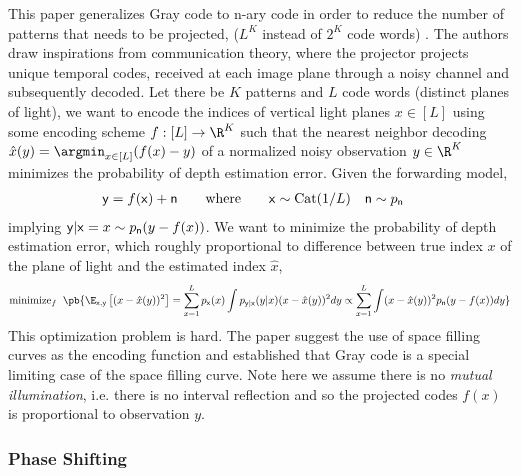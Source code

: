 \documentclass[../writeup.tex]{subfiles}
\begin{document}
This paper generalizes Gray code to n-ary code in order to reduce the number of patterns that needs to be projected, ($L^K$ instead of $2^K$ code words) \cite{hornOptimalStructuredLight1997}. The authors draw inspirations from communication theory, where the projector projects unique temporal codes, received at each image plane through a noisy channel and subsequently decoded. Let there be $K$ patterns and $L$ code words (distinct planes of light), we want to encode the indices of vertical light planes $x\in [L]$ using some encoding scheme $f:[L] \to \R^K$ such that the nearest neighbor decoding $\hat{x}(y) = \argmin_{x\in [L]} ( f(x)-y )$ of a normalized noisy observation $y\in\R^K$ minimizes the probability of depth estimation error. Given the forwarding model,
\begin{align*}
    \mathsf{y} = f(\mathsf{x}) + \mathsf{n}
    \quad\quad\text{where}\quad\quad
    \mathsf{x} 
        &\sim \text{Cat}(1/L)
    \quad
    \mathsf{n}
        \sim p_{\mathsf{n}}
\end{align*}
implying $\mathsf{y}|\mathsf{x}=x\sim p_{\mathsf{n}}(y - f(x))$. We want to minimize the probability of depth estimation error, which roughly proportional to difference between true index $x$ of the plane of light and the estimated index $\hat{x}$,
\begin{align*}
    \text{minimize}_{f}\;\; \pb{
        \E_{\rx,\ry} \left[ (x-\hat{x}(y))^2 \right]
        = \sum_{x=1}^L p_{\rx}(x) \int p_{\ry|\rx}(y|x) (x - \hat{x}(y))^2 dy
        \propto \sum_{x=1}^L \int (x-\hat{x}(y))^2 p_{\rn}(y-f(x)) dy
    }
\end{align*}
This optimization problem is hard. The paper suggest the use of space filling curves as the encoding function and established that Gray code is a special limiting case of the space filling curve. Note here we assume there is no \textit{mutual illumination}, i.e. there is no interval reflection and so the projected codes $f(x)$ is proportional to observation $y$. 

\subsubsection{Phase Shifting}
\end{document}
